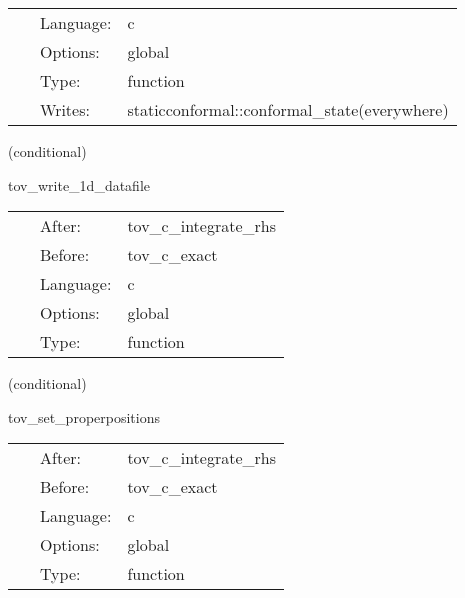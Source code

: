 \hspace{5mm}

 \begin{tabular*}{160mm}{cll} 
~ & Language:  & c \\ 
~ & Options:  & global \\ 
~ & Type:  & function \\ 
~ & Writes:  & staticconformal::conformal\_state(everywhere) \\ 
\end{tabular*} 


\vspace{5mm}

   (conditional) 

\hspace{5mm} tov\_write\_1d\_datafile 

\hspace{5mm}{\it save data to file and exit } 


\hspace{5mm}

 \begin{tabular*}{160mm}{cll} 
~ & After:  & tov\_c\_integrate\_rhs \\ 
~ & Before:  & tov\_c\_exact \\ 
~ & Language:  & c \\ 
~ & Options:  & global \\ 
~ & Type:  & function \\ 
\end{tabular*} 


\vspace{5mm}

   (conditional) 

\hspace{5mm} tov\_set\_properpositions 

\hspace{5mm}{\it steer ns position parameters according to proper distance } 


\hspace{5mm}

 \begin{tabular*}{160mm}{cll} 
~ & After:  & tov\_c\_integrate\_rhs \\ 
~ & Before:  & tov\_c\_exact \\ 
~ & Language:  & c \\ 
~ & Options:  & global \\ 
~ & Type:  & function \\ 
\end{tabular*} 


